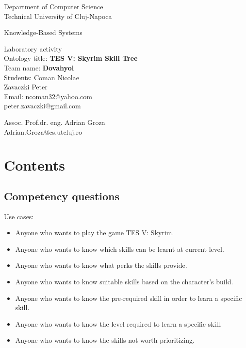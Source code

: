 \documentclass[a4paper,12pt]{report}
\begin{document}
\newcommand{\h}{\texttt}

\vspace{-5cm}
\begin{center}
Department of Computer Science\\
Technical University of Cluj-Napoca%
\end{center}
\vspace{1cm}
\begin{center}
\begin{Large}
Knowledge-Based Systems\\
\end{Large}
Laboratory activity\\


Ontology title: \textbf{TES V: Skyrim Skill Tree}\\
Team name: \textbf{Dovahyol}\\
Students: Coman Nicolae\\
Zavaczki Peter\\
Email: ncoman32@yahoo.com\\
peter.zavaczki@gmail.com\\

\vspace*{14cm}

Assoc. Prof.dr. eng. Adrian Groza\\
Adrian.Groza@cs.utcluj.ro
\end{center}

\newpage

\tableofcontents
\clearpage
\chapter{Contents}
\section{Competency questions}
Use cases:

\begin{itemize}
\item Anyone who wants to play the game TES V: Skyrim.
\item Anyone who wants to know which skills can be learnt at current level.
\item Anyone who wants to know what perks the skills provide.
\item Anyone who wants to know suitable skills based on the character's build.
\item Anyone who wants to know the pre-required skill in order to learn a specific skill.
\item Anyone who wants to know the level required to learn a specific skill.
\item Anyone who wants to know the skills not worth prioritizing.
\end{itemize}
\end{document}
